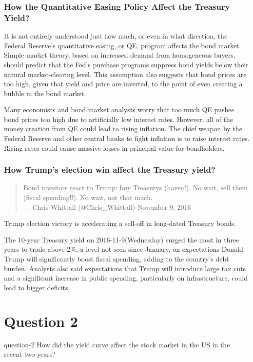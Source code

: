 \subsubsection{How the Quantitative Easing Policy Affect the Treasury Yield?}
It is not entirely understood just how much, or even in what direction, the Federal Reserve's quantitative easing, or QE, program affects the bond market. Simple market theory, based on increased demand from homogeneous buyers, should predict that the Fed's purchase programs suppress bond yields below their natural market-clearing level. This assumption also suggests that bond prices are too high, given that yield and price are inverted, to the point of even creating a bubble in the bond market.

Many economists and bond market analysts worry that too much QE pushes bond prices too high due to artificially low interest rates. However, all of the money creation from QE could lead to rising inflation. The chief weapon by the Federal Reserve and other central banks to fight inflation is to raise interest rates. Rising rates could cause massive losses in principal value for bondholders.

\subsubsection{How Trump's election win affect the Treasury yield?}
\begin{quotation}
	Bond investors react to Trump: buy Treasurys (haven!). No wait, sell them (fiscal spending!!). No wait, not that much. \\	--- Chris Whittall (@Chris\_Whittall) November 9, 2016
\end{quotation}

Trump election victory is accelerating a sell-off in long-dated Treasury bonds.

The 10-year Treasury yield on 2016-11-9(Wednesday) surged the most in three years to trade above 2\%, a level not seen since January, on expectations Donald Trump will significantly boost fiscal spending, adding to the country’s debt burden. Analysts also said expectations that Trump will introduce large tax cuts and a significant increase in public spending, particularly on infrastructure, could lead to bigger deficits.



\section{Question 2}
\begin{statebox}{}{question-2}
    How did the yield curve affect the stock market in the US in the recent two years?
\end{statebox}

